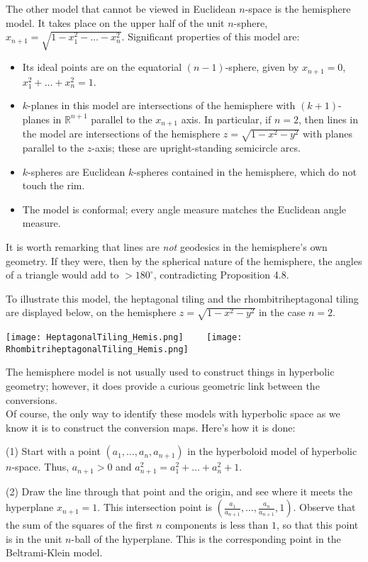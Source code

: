 \documentclass[leqno]{book}
\begin{document}
The other model that cannot be viewed in Euclidean $n$-space is the hemisphere model.  It takes place on the upper half of the unit $n$-sphere, $x_{n+1}=\sqrt{1-x_1^2-\dots-x_n^2}$.  Significant properties of this model are:
\begin{itemize}
\item Its ideal points are on the equatorial $(n-1)$-sphere, given by $x_{n+1}=0$, $x_1^2+\dots+x_n^2=1$.

\item $k$-planes in this model are intersections of the hemisphere with $(k+1)$-planes in $\mathbb R^{n+1}$ parallel to the $x_{n+1}$ axis.  In particular, if $n=2$, then lines in the model are intersections of the hemisphere $z=\sqrt{1-x^2-y^2}$ with planes parallel to the $z$-axis; these are upright-standing semicircle arcs.

\item $k$-spheres are Euclidean $k$-spheres contained in the hemisphere, which do not touch the rim.

\item The model is conformal; every angle measure matches the Euclidean angle measure.
\end{itemize}
It is worth remarking that lines are \emph{not} geodesics in the hemisphere's own geometry.  If they were, then by the spherical nature of the hemisphere, the angles of a triangle would add to $>180^\circ$, contradicting Proposition 4.8.

To illustrate this model, the heptagonal tiling and the rhombitriheptagonal tiling are displayed below, on the hemisphere $z=\sqrt{1-x^2-y^2}$ in the case $n=2$.
\begin{center}
\texttt{[image: HeptagonalTiling\_Hemis.png]}~~~~
\texttt{[image: RhombitriheptagonalTiling\_Hemis.png]}
\end{center}
The hemisphere model is not usually used to construct things in hyperbolic geometry; however, it does provide a curious geometric link between the conversions.\\

\noindent Of course, the only way to identify these models with hyperbolic space as we know it is to construct the conversion maps.  Here's how it is done:

(1) Start with a point $(a_1,\dots,a_n,a_{n+1})$ in the hyperboloid model of hyperbolic $n$-space.  Thus, $a_{n+1}>0$ and $a_{n+1}^2=a_1^2+\dots+a_n^2+1$.

(2) Draw the line through that point and the origin, and see where it meets the hyperplane $x_{n+1}=1$.  This intersection point is $\left(\frac{a_1}{a_{n+1}},\dots,\frac{a_n}{a_{n+1}},1\right)$.  Observe that the sum of the squares of the first $n$ components is less than $1$, so that this point is in the unit $n$-ball of the hyperplane.  This is the corresponding point in the Beltrami-Klein model.
\end{document}
